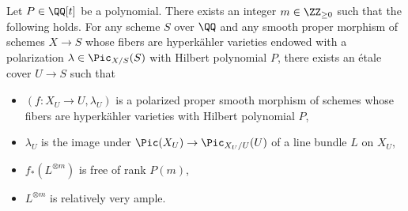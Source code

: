 \begin{lemma}\label{lem:bigmatsusaka}
Let $P \in \QQ[t]$ be a polynomial. There exists an integer $m \in \ZZ_{\geq 0}$ such that the following holds. For any scheme $S$ over $\QQ$ and any smooth proper morphism of schemes $X \rightarrow S$ whose fibers are hyperk\"ahler varieties endowed with a polarization $\lambda \in \Pic_{X/S}(S)$ with Hilbert polynomial $P$, there exists an \'etale cover $U \rightarrow S$ such that 
\begin{itemize}
\item $(f\colon X_U \rightarrow U, \lambda_U)$ is a polarized proper smooth morphism of schemes whose fibers are hyperk\"ahler varieties with Hilbert polynomial $P$,
\item $\lambda_U$ is the image under $\Pic(X_U) \rightarrow \Pic_{{X_U}/{U}}(U)$ of a line bundle $L$ on $X_U$,
\item $f_* (L^{\otimes m})$ is free of rank $P(m)$,
\item $L^{\otimes m}$ is relatively very ample.
\end{itemize}
\end{lemma}

